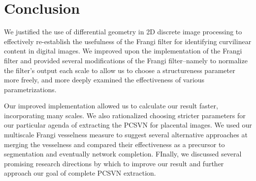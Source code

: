 \chapter{Conclusion} \label{ch:conclusion}

We justified the use of differential geometry in 2D discrete image processing to effectively re-establish the usefulness of the Frangi filter for identifying curvilinear content in digital images. We improved upon the implementation of the Frangi filter and provided several modifications of the Frangi filter--namely to normalize the filter's output each scale to allow us to choose a structureness parameter more freely, and more deeply examined the effectiveness of various parametrizations.

Our improved implementation allowed us to calculate our result faster, incorporating many scales. We also rationalized choosing stricter parameters for our particular agenda of extracting the PCSVN for placental images. We used our multiscale Frangi vesselness measure to suggest several alternative approaches at merging the vesselness and compared their effectiveness as a precursor to segmentation and eventually network completion. FInally, we discussed several promising research directions by which to improve our result and further approach our goal of complete PCSVN extraction. 

